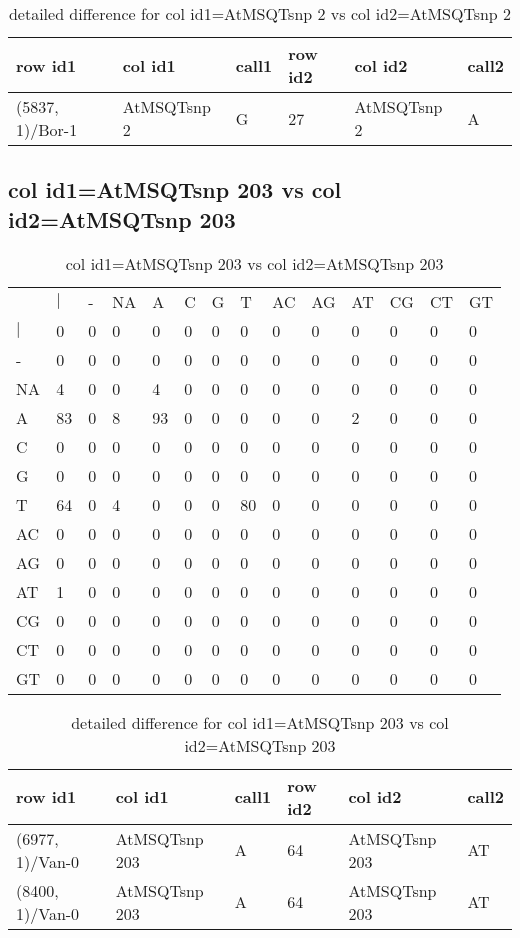 \begin{center}
\begin{longtable}{|l|l|l|l|l|l|}
\caption{detailed difference for col id1=AtMSQTsnp 2 vs col id2=AtMSQTsnp 2} \label{table_dm773}\\
\hline
row id1&col id1&call1&row id2&col id2&call2\\
\hline
(5837, 1)/Bor-1&AtMSQTsnp 2&G&27&AtMSQTsnp 2&A\\
\hline
\end{longtable}
\end{center}

\subsection{col id1=AtMSQTsnp 203 vs col id2=AtMSQTsnp 203}
\begin{center}
\begin{longtable}{|l|l|l|l|l|l|l|l|l|l|l|l|l|l|}
\caption{col id1=AtMSQTsnp 203 vs col id2=AtMSQTsnp 203} \label{table_dm774}\\
\hline
\\
\hline
&$|$&-&NA&A&C&G&T&AC&AG&AT&CG&CT&GT\\
$|$&0&0&0&0&0&0&0&0&0&0&0&0&0\\
-&0&0&0&0&0&0&0&0&0&0&0&0&0\\
NA&4&0&0&4&0&0&0&0&0&0&0&0&0\\
A&83&0&8&93&0&0&0&0&0&2&0&0&0\\
C&0&0&0&0&0&0&0&0&0&0&0&0&0\\
G&0&0&0&0&0&0&0&0&0&0&0&0&0\\
T&64&0&4&0&0&0&80&0&0&0&0&0&0\\
AC&0&0&0&0&0&0&0&0&0&0&0&0&0\\
AG&0&0&0&0&0&0&0&0&0&0&0&0&0\\
AT&1&0&0&0&0&0&0&0&0&0&0&0&0\\
CG&0&0&0&0&0&0&0&0&0&0&0&0&0\\
CT&0&0&0&0&0&0&0&0&0&0&0&0&0\\
GT&0&0&0&0&0&0&0&0&0&0&0&0&0\\
\hline
\end{longtable}
\end{center}

\begin{center}
\begin{longtable}{|l|l|l|l|l|l|}
\caption{detailed difference for col id1=AtMSQTsnp 203 vs col id2=AtMSQTsnp 203} \label{table_dm775}\\
\hline
row id1&col id1&call1&row id2&col id2&call2\\
\hline
(6977, 1)/Van-0&AtMSQTsnp 203&A&64&AtMSQTsnp 203&AT\\
(8400, 1)/Van-0&AtMSQTsnp 203&A&64&AtMSQTsnp 203&AT\\
\hline
\end{longtable}
\end{center}

